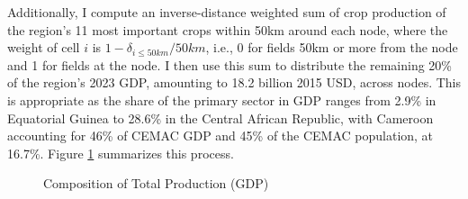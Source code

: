 \documentclass[a4paper]{article}
\begin{document}
 Additionally, I compute an inverse-distance weighted sum of crop production of the region's 11 most important crops within 50km around each node, where the weight of cell $i$ is $1 - \delta_{i\leq 50km} / 50km$, i.e., 0 for fields 50km or more from the node and 1 for fields at the node. I then use this sum to distribute the remaining 20\% of the region's 2023 GDP, amounting to 18.2 billion 2015 USD, across nodes. This is appropriate as the share of the primary sector in GDP ranges from 2.9\% in Equatorial Guinea to 28.6\% in the Central African Republic, with Cameroon accounting for 46\% of CEMAC GDP and 45\% of the CEMAC population, at 16.7\%. Figure \ref{fig:GDPNet} summarizes this process.
 
\begin{figure}[H] \vspace{-3mm}
\centering
\caption{\label{fig:GDPNet} Composition of Total Production (GDP)}
\end{figure}
\end{document}
